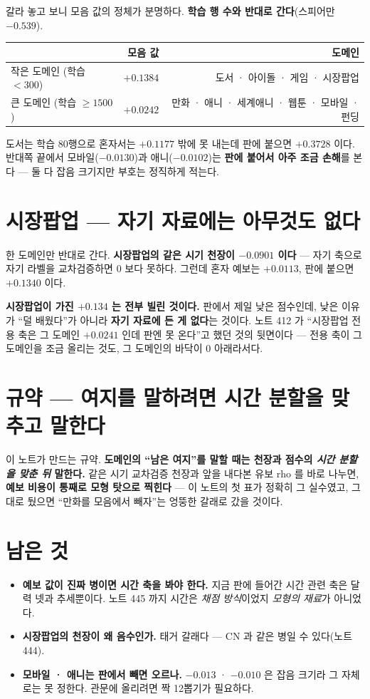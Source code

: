 \documentclass[11pt]{article}
\begin{document}
갈라 놓고 보니 모음 값의 정체가 분명하다. \textbf{학습 행 수와 반대로
간다}(스피어만 $-0.539$).

\begin{center}
\begin{tabular}{lrr}
\hline
 & 모음 값 & 도메인 \\
\hline
작은 도메인 (학습 $<300$) & $\mathbf{+0.1384}$ & 도서 · 아이돌 · 게임 · 시장팝업 \\
큰 도메인 (학습 $\ge 1500$) & $+0.0242$ & 만화 · 애니 · 세계애니 · 웹툰 · 모바일 · 펀딩 \\
\hline
\end{tabular}
\end{center}

도서는 학습 80행으로 혼자서는 $+0.1177$ 밖에 못 내는데 판에 붙으면
$+0.3728$ 이다. 반대쪽 끝에서 모바일($-0.0130$)과 애니($-0.0102$)는
\textbf{판에 붙어서 아주 조금 손해}를 본다 --- 둘 다 잡음 크기지만
부호는 정직하게 적는다.

\section{시장팝업 --- 자기 자료에는 아무것도 없다}

한 도메인만 반대로 간다. \textbf{시장팝업의 같은 시기 천장이 $-0.0901$
이다} --- 자기 축으로 자기 라벨을 교차검증하면 $0$ 보다 못하다. 그런데
혼자 예보는 $+0.0113$, 판에 붙으면 $+0.1340$ 이다.

\textbf{시장팝업이 가진 $+0.134$ 는 전부 빌린 것이다.} 판에서 제일 낮은
점수인데, 낮은 이유가 ``덜 배웠다''가 아니라 \textbf{자기 자료에 든 게
없다}는 것이다. 노트 412 가 ``시장팝업 전용 축은 그 도메인 $+0.0241$ 인데
판엔 못 온다''고 했던 것의 뒷면이다 --- 전용 축이 그 도메인을 조금
올리는 것도, 그 도메인의 바닥이 $0$ 아래라서다.

\section*{규약 --- 여지를 말하려면 시간 분할을 맞추고 말한다}

이 노트가 만드는 규약. \textbf{도메인의 ``남은 여지''를 말할 때는 천장과
점수의 \emph{시간 분할을 맞춘 뒤} 말한다.} 같은 시기 교차검증 천장과
앞을 내다본 유보 rho 를 바로 나누면, \textbf{예보 비용이 통째로 모형
탓으로 찍힌다} --- 이 노트의 첫 표가 정확히 그 실수였고, 그대로 뒀으면
``만화를 모음에서 빼자''는 엉뚱한 갈래로 갔을 것이다.

\section*{남은 것}

\begin{itemize}
\item \textbf{예보 값이 진짜 병이면 시간 축을 봐야 한다.} 지금 판에
들어간 시간 관련 축은 달력 넷과 추세뿐이다. 노트 445 까지 시간은
\emph{채점 방식}이었지 \emph{모형의 재료}가 아니었다.
\item \textbf{시장팝업의 천장이 왜 음수인가.} 태거 갈래다 --- CN 과 같은
병일 수 있다(노트 444).
\item \textbf{모바일 · 애니는 판에서 빼면 오르나.} $-0.013$ · $-0.010$ 은
잡음 크기라 그 자체로는 못 정한다. 관문에 올리려면 짝 12뽑기가 필요하다.
\end{itemize}
\end{document}
